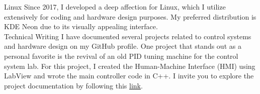 
\begin{cvskills}

  \cvskill
    {Linux} %
    {Since 2017, I developed a deep affection for Linux, which I utilize extensively for coding and hardware design purposes. My preferred distribution is KDE Neon due to its visually appealing interface.}\\ %
  \cvskill
    {Technical Writing} %
    {I have documented several projects related to control systems and hardware design on my GitHub profile. One project that stands out as a personal favorite is the revival of an old PID tuning machine for the control system lab. For this project, I created the Human-Machine Interface (HMI) using LabView and wrote the main controller code in C++. I invite you to explore the project documentation by following this \href{https://github.com/justraven/Feedback-Educational-Servo-ES151-Remake}{\underline{link}}.}\\ %

\end{cvskills}